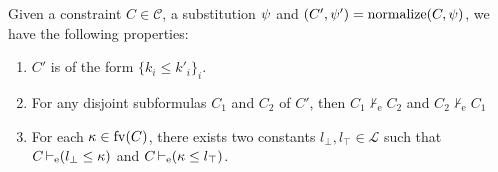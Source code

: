 
\begin{lemma}
  Given a constraint $C\in\mathcal C$, a substitution $\mathrm{\psi}$ and
  $(C',\mathrm{\psi}') = \operatorname{normalize}(C,\mathrm{\psi})$, we have the following properties:
  \begin{enumerate}
  \item $C'$ is of the form $\{ k_i \leq k'_i\}_i$.
  \item For any disjoint subformulas $C_1$ and $C_2$ of $C'$,
    then $C_1 \operatorname{\nvdash_e} C_2$ and $C_2 \operatorname{\nvdash_e} C_1$
  \item For each $\kappa \in \operatorname{fv}(C)$,
    there exists two constants $l_\bot,l_\top \in \mathcal L$  such that
    $C \operatorname{\vdash_e} (l_\bot \leq \kappa)$ and $C \operatorname{\vdash_e} (\kappa \leq l_\top)$.
  \end{enumerate}
\end{lemma}
  


